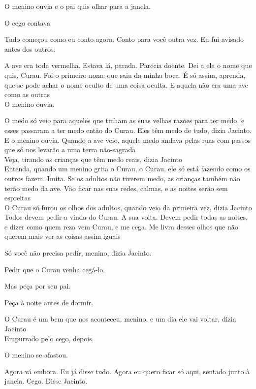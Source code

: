 O menino ouvia e o pai quis olhar para a janela.

O cego contava

Tudo começou como eu conto agora. Conto para você outra vez. Eu fui
avisado antes dos outros.

A ave era toda vermelha. Estava lá, parada. Parecia doente. Dei a ela o
nome que quis, Curau. Foi o primeiro nome que saiu da minha boca. É só
assim, aprenda, que se pode achar o nome oculto de uma coisa oculta. E
aquela não era uma ave como as outras\\

O menino ouvia.

O medo só veio para aqueles que tinham as suas velhas razões para ter
medo, e esses passaram a ter medo então do Curau. Eles têm medo de tudo,
dizia Jacinto. E o menino ouvia. Quando a ave veio, aquele medo andava
pelas ruas com passos que só nos levarão a uma terra não-sagrada\\

Veja, tirando as crianças que têm medo reais, dizia Jacinto\\

Entenda, quando um menino grita o Curau, o Curau, ele só está fazendo
como os outros fazem. Imita. Se os adultos não tiverem medo, as crianças
também não terão medo da ave. Vão ficar nas suas redes, calmas, e as
noites serão sem espreitas\\

O Curau só furou os olhos dos adultos, quando veio da primeira vez,
dizia Jacinto\\

Todos devem pedir a vinda do Curau. A sua volta. Devem pedir todas as
noites, e dizer como quem reza vem Curau, e me cega. Me livra desses
olhos que não querem mais ver as coisas assim iguais

Só você não precisa pedir, menino, dizia Jacinto.

Pedir que o Curau venha cegá-lo.

Mas peça por seu pai.

Peça à noite antes de dormir.

O Curau é um bem que nos aconteceu, menino, e um dia ele vai voltar,
dizia Jacinto\\

Empurrado pelo cego, depois.

O menino se afastou.

Agora vá embora. Eu já disse tudo. Agora eu quero ficar só aqui, sentado
junto à janela. Cego. Disse Jacinto.\\

